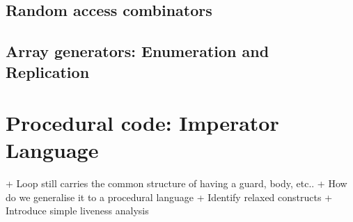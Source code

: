 \documentclass[preamble.tex]{subfiles}
\begin{document}


\subsection{Random access combinators}



\subsection{Array generators: Enumeration and Replication}



\section{Procedural code: Imperator Language}

+ Loop still carries the common structure of having a guard, body, etc..
+ How do we generalise it to a procedural language
+ Identify relaxed constructs
+ Introduce simple liveness analysis

\maybebib
\end{document}
